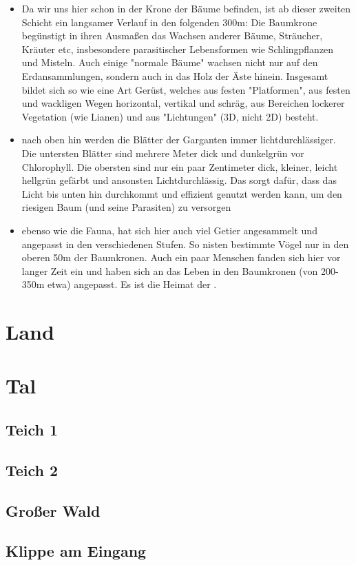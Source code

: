 \begin{itemize}
	\item Da wir uns hier schon in der Krone der Bäume befinden, ist ab dieser zweiten Schicht ein langsamer Verlauf in den folgenden 300m: Die Baumkrone begünstigt in ihren Ausmaßen das Wachsen anderer Bäume, Sträucher, Kräuter etc, insbesondere parasitischer Lebensformen wie Schlingpflanzen und Misteln. Auch einige "normale Bäume" wachsen nicht nur auf den Erdansammlungen, sondern auch in das Holz der Äste hinein. Insgesamt bildet sich so wie eine Art Gerüst, welches aus festen "Platformen", aus festen und wackligen Wegen horizontal, vertikal und schräg, aus Bereichen lockerer Vegetation (wie Lianen) und aus "Lichtungen" (3D, nicht 2D) besteht.
	\item nach oben hin werden die Blätter der Garganten immer lichtdurchlässiger. Die untersten Blätter sind mehrere Meter dick und dunkelgrün vor Chlorophyll. Die obersten sind nur ein paar Zentimeter dick, kleiner, leicht hellgrün gefärbt und ansonsten Lichtdurchlässig. Das sorgt dafür, dass das Licht bis unten hin durchkommt und effizient genutzt werden kann, um den riesigen Baum (und seine Parasiten) zu versorgen
	\item ebenso wie die Fauna, hat sich hier auch viel Getier angesammelt und angepasst in den verschiedenen Stufen. So nisten bestimmte Vögel nur in den oberen 50m der Baumkronen. Auch ein paar Menschen fanden sich hier vor langer Zeit ein und haben sich an das Leben in den Baumkronen (von 200-350m etwa) angepasst. Es ist die Heimat der .
\end{itemize}

\section{Land}
\section{Tal}
\subsection{Teich 1}
\subsection{Teich 2}
\subsection{Großer Wald}
\subsection{Klippe am Eingang}

